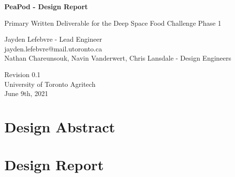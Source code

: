 \documentclass{report}
\begin{document}
\begin{titlepage}
    \begin{center}
        \vspace*{1.2cm}

        \textbf{\large{PeaPod - Design Report}}

        \vspace{0.5cm}

        Primary Written Deliverable for the Deep Space Food Challenge Phase 1

        \vfill

        Jayden Lefebvre - Lead Engineer\\\small{jayden.lefebvre@mail.utoronto.ca}\\
        \vspace{1cm}
        Nathan Chareunsouk, Navin Vanderwert, Chris Lansdale - Design Engineers

        \vspace{2.5cm}

        Revision 0.1\\
        University of Toronto Agritech\\
        June 9th, 2021

    \end{center}
\end{titlepage}

\thispagestyle{plain}

\tableofcontents
\newpage

\section{Design Abstract}

\section{Design Report}
\end{document}

